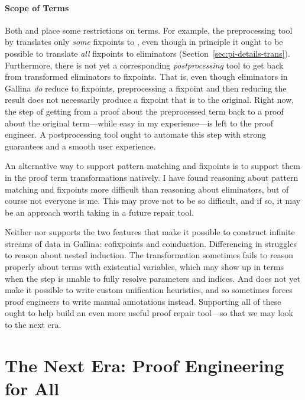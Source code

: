 \paragraph{Scope of Terms}
Both \sysname and \toolnamec place some restrictions on  terms.
For example, the preprocessing tool by  translates only \textit{some} fixpoints to ,
even though in principle it ought to be possible to translate \textit{all} fixpoints to eliminators (Section~\ref{sec:pi-details-trans}).
Furthermore, there is not yet a corresponding \textit{postprocessing} tool to get back from transformed eliminators to fixpoints.
That is, even though eliminators in Gallina \textit{do} reduce to fixpoints, preprocessing a fixpoint and then reducing the result does not necessarily 
produce a fixpoint that is  to the original. Right now, the step of getting from a proof about the preprocessed term
back to a proof about the original term---while easy in my experience---is left to the proof engineer.
A postprocessing tool ought to automate this step with strong guarantees and a smooth user experience.

An alternative way to support pattern matching and fixpoints is to support them in the proof term transformations natively.
I have found reasoning about pattern matching and fixpoints more difficult than reasoning about eliminators,
but of course not everyone is me.
This may prove not to be so difficult, and if so, it may be an approach worth taking in a future repair tool.

Neither \sysname nor \toolnamec supports the two features that make it possible
to construct infinite streams of data in Gallina:
cofixpoints and coinduction.
Differencing in \sysname struggles to reason about nested induction.
The \toolnamec transformation sometimes fails to reason properly about terms with existential variables,
which may show up in terms when the  step is unable to fully resolve parameters and indices.
And \toolnamec does not yet make it possible to write custom unification heuristics, and so
sometimes forces proof engineers to write manual annotations instead.
Supporting all of these ought to help build an even more useful proof repair tool---so that we may
look to the next era.

\section{The Next Era: Proof Engineering for All}
\label{sec:forall}

